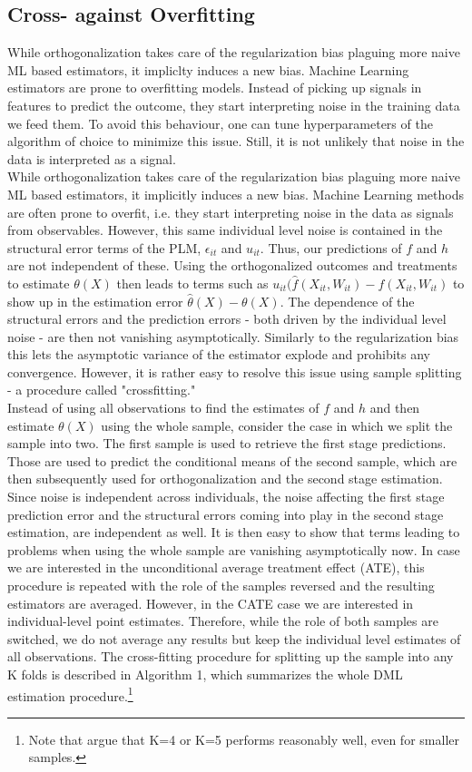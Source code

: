 \subsection{Cross- against Overfitting} \label{sec:cross-fitting}
While orthogonalization takes care of the regularization bias plaguing more naive ML based estimators, it impliclty induces a new bias. Machine Learning estimators are prone to overfitting models. Instead of picking up signals in features to predict the outcome, they start interpreting noise in the training data we feed them. To avoid this behaviour, one can tune hyperparameters of the algorithm of choice to minimize this issue. Still, it is not unlikely that noise in the data is interpreted as a signal. \\
While orthogonalization takes care of the regularization bias plaguing more naive ML based estimators, it implicitly induces a new bias. Machine Learning methods are often prone to overfit, i.e. they start interpreting noise in the data as signals from observables. However, this same individual level noise is contained in the structural error terms of the PLM, $\epsilon_{it}$ and $u_{it}$. Thus, our predictions of $f$ and $h$ are not independent of these. Using the orthogonalized outcomes and treatments to estimate $\theta(X)$ then leads to terms such as $u_{it}(\hat{f}(X_{it}, W_{it}) - f(X_{it}, W_{it})$ to show up in the estimation error $\hat{\theta}(X) - \theta(X)$. The dependence of the structural errors and the prediction errors - both driven by the individual level noise - are then not vanishing asymptotically. Similarly to the regularization bias this lets the asymptotic variance of the estimator explode and prohibits any convergence. However, it is rather easy to resolve this issue using sample splitting - a procedure called "crossfitting." \\ 
Instead of using all observations to find the estimates of $f$ and $h$ and then estimate $\theta(X)$ using the whole sample, consider the case in which we split the sample into two. The first sample is used to retrieve the first stage predictions. Those are used to predict the conditional means of the second sample, which are then subsequently used for orthogonalization and the second stage estimation. Since noise is independent across individuals, the noise affecting the first stage prediction error and the structural errors coming into play in the second stage estimation, are independent as well. It is then easy to show that terms leading to problems when using the whole sample are vanishing asymptotically now. In case we are interested in the unconditional average treatment effect (ATE), this procedure is repeated with the role of the samples reversed and the resulting estimators are averaged. However, in the CATE case we are interested in individual-level point estimates. Therefore, while the role of both samples are switched, we do not average any results but keep the individual level estimates of all observations. The cross-fitting procedure for splitting up the sample into any K folds is described in Algorithm 1, which summarizes the whole DML estimation procedure.\footnote{Note that \cite{DML2017} argue that K=4 or K=5 performs reasonably well, even for smaller samples.} 

